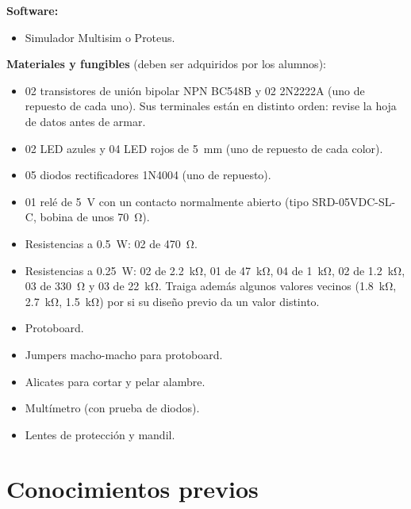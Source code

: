 \documentclass[11pt,a4paper]{article}
\let\needspace\Needspace
\begin{document}
\noindent\textbf{Software:}
\begin{itemize}
    \item Simulador Multisim o Proteus.
\end{itemize}

\vspace{0.25cm}
\needspace{6\baselineskip}
\noindent\textbf{Materiales y fungibles} (deben ser adquiridos por los alumnos):
\begin{itemize}
    \item 02 transistores de unión bipolar NPN BC548B y 02 2N2222A (uno de repuesto de cada
          uno). Sus terminales están en distinto orden: revise la hoja de datos antes de armar.
    \item 02 LED azules y 04 LED rojos de \qty{5}{\milli\metre} (uno de repuesto de cada color).
    \item 05 diodos rectificadores 1N4004 (uno de repuesto).
    \item 01 relé de \qty{5}{\volt} con un contacto normalmente abierto (tipo
          SRD-05VDC-SL-C, bobina de unos \qty{70}{\ohm}).
    \item Resistencias a \qty{0.5}{\watt}: 02 de \qty{470}{\ohm}.
    \item Resistencias a \qty{0.25}{\watt}:
          02 de \qty{2.2}{\kilo\ohm},
          01 de \qty{47}{\kilo\ohm},
          04 de \qty{1}{\kilo\ohm},
          02 de \qty{1.2}{\kilo\ohm},
          03 de \qty{330}{\ohm} y
          03 de \qty{22}{\kilo\ohm}.
          Traiga además algunos valores vecinos (\qty{1.8}{\kilo\ohm},
          \qty{2.7}{\kilo\ohm}, \qty{1.5}{\kilo\ohm}) por si su diseño previo da un valor
          distinto.
    \item Protoboard.
    \item Jumpers macho-macho para protoboard.
    \item Alicates para cortar y pelar alambre.
    \item Multímetro (con prueba de diodos).
    \item Lentes de protección y mandil.
\end{itemize}

\FloatBarrier
\section{Conocimientos previos}
\end{document}
